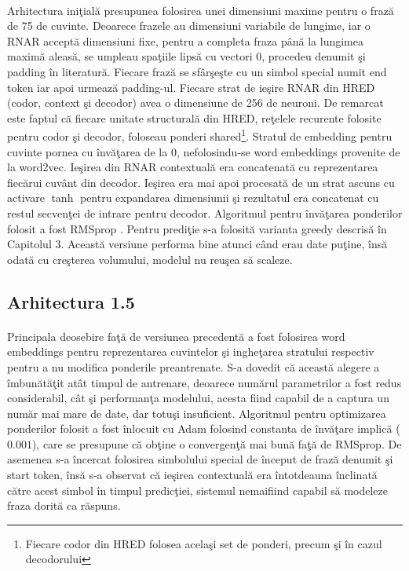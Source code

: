 \paragraph{}
Arhitectura ini\c tial\u a presupunea folosirea unei dimensiuni maxime pentru o fraz\u a de 75 de cuvinte. Deoarece frazele au dimensiuni variabile de lungime, iar o RNAR accept\u a dimensiuni fixe, pentru a completa fraza p\^ an\u a la lungimea maxim\u a aleas\u a, se umpleau spa\c tiile lips\u a cu vectori \(0\), procedeu denumit \c si padding \^ in literatur\u a. Fiecare fraz\u a se sf\^ ar\c se\c ste cu un simbol special numit end token iar apoi urmeaz\u a padding-ul.  Fiecare strat de ie\c sire RNAR din HRED (codor, context \c si decodor) avea o dimensiune de 256 de neuroni. De remarcat este faptul c\u a fiecare unitate structural\u a din HRED, re\c telele recurente folosite pentru codor \c si decodor, foloseau ponderi shared\footnote{Fiecare codor din HRED folosea acela\c si set de ponderi, precum \c si \^ in cazul decodorului}. Stratul de embedding pentru cuvinte pornea cu \^ inv\u a\c tarea de la 0, nefolosindu-se word embeddings provenite de la word2vec. Ie\c sirea din RNAR contextual\u a era concatenat\u a cu reprezentarea fiec\u arui cuv\^ ant din decodor. Ie\c sirea era mai apoi procesat\u a de un strat ascuns cu activare \(\tanh\) pentru expandarea dimensiunii \c si rezultatul era concatenat cu restul secven\c tei de intrare pentru decodor. Algoritmul pentru \^ inv\u a\c tarea ponderilor folosit a fost RMSprop \cite{rmsprop}. Pentru predi\c tie s-a folosit\u a varianta greedy descris\u a \^ in Capitolul 3. Aceast\u a versiune performa bine atunci c\^ and erau date pu\c tine, \^ ins\u a odat\u a cu cre\c sterea volumului, modelul nu reu\c sea s\u a scaleze.

\subsection{Arhitectura 1.5}

\paragraph{}
Principala deosebire fa\c t\u a de versiunea precedent\u a a fost folosirea word embeddings pentru reprezentarea cuvintelor \c si inghe\c tarea stratului respectiv pentru a nu modifica ponderile preantrenate. S-a dovedit c\u a aceast\u a alegere a \^ imbun\u at\u a\c tit at\^ at timpul de antrenare, deoarece num\u arul parametrilor a fost redus considerabil, c\^ at \c si performan\c ta modelului, acesta fiind capabil de a captura un num\u ar mai mare de date, dar totu\c si insuficient. Algoritmul pentru optimizarea ponderilor folosit a fost \^ inlocuit cu Adam \cite{DBLP:journals/corr/KingmaB14} folosind constanta de \^ inv\u a\c tare implic\u a (\(0.001\)), care se presupune c\u a ob\c tine o convergen\c t\u a mai bun\u a fa\c t\u a de RMSprop. De asemenea s-a \^ incercat folosirea simbolului special de \^ inceput de fraz\u a denumit \c si start token, \^ ins\u a s-a observat c\u a ie\c sirea contextual\u a era \^ intotdeauna \^ inclinat\u a c\u atre acest simbol \^ in timpul predic\c tiei, sistemul nemaifiind capabil s\u a modeleze fraza dorit\u a ca r\u aspuns.

